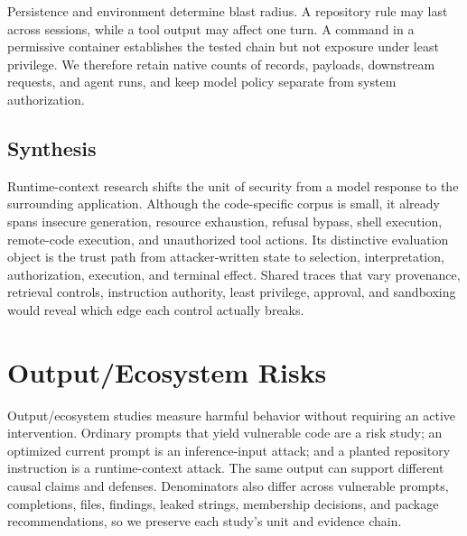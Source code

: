 \documentclass[acmsmall,screen,review]{acmart}
\begin{document}
Persistence and environment determine blast radius. A repository rule may last across sessions, while a tool output may affect one turn. A command in a permissive container establishes the tested chain but not exposure under least privilege. We therefore retain native counts of records, payloads, downstream requests, and agent runs, and keep model policy separate from system authorization.

\subsection{Synthesis}
Runtime-context research shifts the unit of security from a model response to the surrounding application. Although the code-specific corpus is small, it already spans insecure generation, resource exhaustion, refusal bypass, shell execution, remote-code execution, and unauthorized tool actions. Its distinctive evaluation object is the trust path from attacker-written state to selection, interpretation, authorization, execution, and terminal effect. Shared traces that vary provenance, retrieval controls, instruction authority, least privilege, approval, and sandboxing would reveal which edge each control actually breaks.

\section{Output/Ecosystem Risks} \label{sec:gensec}

Output/ecosystem studies measure harmful behavior without requiring an active intervention. Ordinary prompts that yield vulnerable code are a risk study; an optimized current prompt is an inference-input attack; and a planted repository instruction is a runtime-context attack. The same output can support different causal claims and defenses. Denominators also differ across vulnerable prompts, completions, files, findings, leaked strings, membership decisions, and package recommendations, so we preserve each study's unit and evidence chain.
\end{document}
